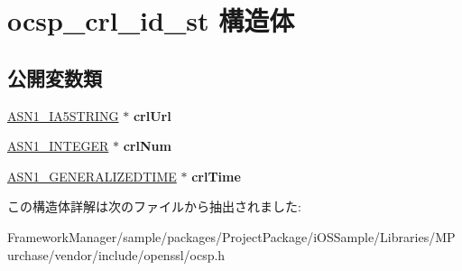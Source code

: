 \hypertarget{structocsp__crl__id__st}{}\section{ocsp\+\_\+crl\+\_\+id\+\_\+st 構造体}
\label{structocsp__crl__id__st}
\subsection*{公開変数類}
\begin{DoxyCompactItemize}
\item 
\hypertarget{structocsp__crl__id__st_a1054ab5bca3c14bd95723caf35a02dc7}{}\hyperlink{structasn1__string__st}{A\+S\+N1\+\_\+\+I\+A5\+S\+T\+R\+I\+N\+G} $\ast$ {\bfseries crl\+Url}\label{structocsp__crl__id__st_a1054ab5bca3c14bd95723caf35a02dc7}

\item 
\hypertarget{structocsp__crl__id__st_a65c4311de0c943b5e162c7ce6091b74e}{}\hyperlink{structasn1__string__st}{A\+S\+N1\+\_\+\+I\+N\+T\+E\+G\+E\+R} $\ast$ {\bfseries crl\+Num}\label{structocsp__crl__id__st_a65c4311de0c943b5e162c7ce6091b74e}

\item 
\hypertarget{structocsp__crl__id__st_ac837981de065fbf9415d54739fedc2f5}{}\hyperlink{structasn1__string__st}{A\+S\+N1\+\_\+\+G\+E\+N\+E\+R\+A\+L\+I\+Z\+E\+D\+T\+I\+M\+E} $\ast$ {\bfseries crl\+Time}\label{structocsp__crl__id__st_ac837981de065fbf9415d54739fedc2f5}

\end{DoxyCompactItemize}


この構造体詳解は次のファイルから抽出されました\+:\begin{DoxyCompactItemize}
\item 
Framework\+Manager/sample/packages/\+Project\+Package/i\+O\+S\+Sample/\+Libraries/\+M\+Purchase/vendor/include/openssl/ocsp.\+h\end{DoxyCompactItemize}
